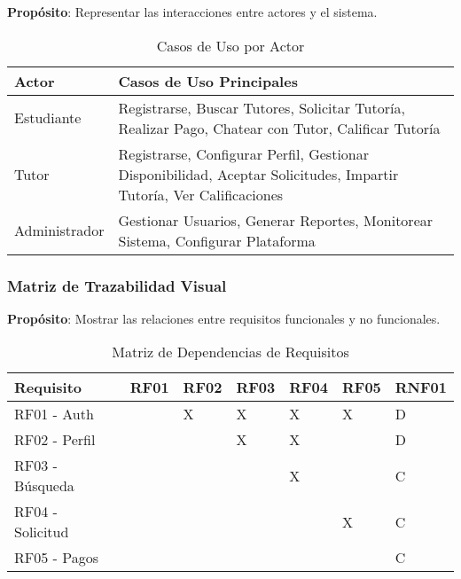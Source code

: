 \documentclass[12pt,a4paper]{article}
\begin{document}
\textbf{Propósito}: Representar las interacciones entre actores y el sistema.

\begin{table}[H]
\centering
\caption{Casos de Uso por Actor}
\begin{tabular}{|p{3cm}|p{10cm}|}
\hline
\rowcolor{headercolor!30}
\textbf{\color{white}Actor} & \textbf{\color{white}Casos de Uso Principales} \\
\hline
Estudiante & Registrarse, Buscar Tutores, Solicitar Tutoría, Realizar Pago, Chatear con Tutor, Calificar Tutoría \\
\hline
Tutor & Registrarse, Configurar Perfil, Gestionar Disponibilidad, Aceptar Solicitudes, Impartir Tutoría, Ver Calificaciones \\
\hline
Administrador & Gestionar Usuarios, Generar Reportes, Monitorear Sistema, Configurar Plataforma \\
\hline
\end{tabular}
\end{table}

\subsubsection{Matriz de Trazabilidad Visual}

\textbf{Propósito}: Mostrar las relaciones entre requisitos funcionales y no funcionales.

\begin{table}[H]
\centering
\caption{Matriz de Dependencias de Requisitos}
\footnotesize
\begin{tabular}{|p{2cm}|p{1.5cm}|p{1.5cm}|p{1.5cm}|p{1.5cm}|p{1.5cm}|p{1.5cm}|}
\hline
\rowcolor{headercolor!30}
\textbf{\color{white}Requisito} & \textbf{\color{white}RF01} & \textbf{\color{white}RF02} & \textbf{\color{white}RF03} & \textbf{\color{white}RF04} & \textbf{\color{white}RF05} & \textbf{\color{white}RNF01} \\
\hline
RF01 - Auth & \cellcolor{gray} & \cellcolor{successgreen!30}X & \cellcolor{successgreen!30}X & \cellcolor{successgreen!30}X & \cellcolor{successgreen!30}X & \cellcolor{warningorange!30}D \\
\hline
RF02 - Perfil & & \cellcolor{gray} & \cellcolor{successgreen!30}X & \cellcolor{successgreen!30}X & & \cellcolor{warningorange!30}D \\
\hline
RF03 - Búsqueda & & & \cellcolor{gray} & \cellcolor{successgreen!30}X & & \cellcolor{dangerred!30}C \\
\hline
RF04 - Solicitud & & & & \cellcolor{gray} & \cellcolor{successgreen!30}X & \cellcolor{dangerred!30}C \\
\hline
RF05 - Pagos & & & & & \cellcolor{gray} & \cellcolor{dangerred!30}C \\
\hline
\end{tabular}
\end{table}
\end{document}
